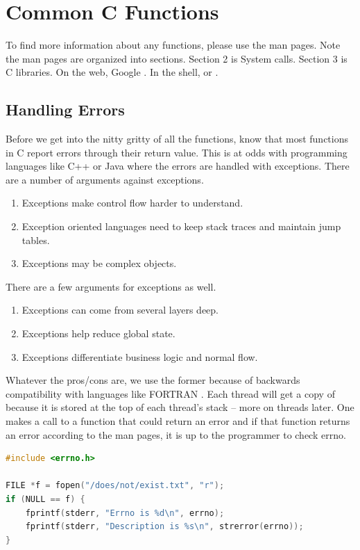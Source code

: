 \section{Common C Functions}

To find more information about any functions, please use the man pages.
Note the man pages are organized into sections.
Section 2 is System calls.
Section 3 is C libraries.
On the web, Google .
In the shell,  or .

\subsection{Handling Errors}

Before we get into the nitty gritty of all the functions, know that most functions in C report errors through their return value.
This is at odds with programming languages like C++ or Java where the errors are handled with exceptions.
There are a number of arguments against exceptions.

\begin{enumerate}
\item Exceptions make control flow harder to understand.
\item Exception oriented languages need to keep stack traces and maintain jump tables.
\item Exceptions may be complex objects.
\end{enumerate}

There are a few arguments for exceptions as well.

\begin{enumerate}
\item Exceptions can come from several layers deep.
\item Exceptions help reduce global state.
\item Exceptions differentiate business logic and normal flow.
\end{enumerate}

Whatever the pros/cons are, we use the former because of backwards compatibility with languages like FORTRAN \cite[P. 84]{fortran72}.
Each thread will get a copy of  because it is stored at the top of each thread's stack -- more on threads later.
One makes a call to a function that could return an error and if that function returns an error according to the man pages, it is up to the programmer to check errno.

\begin{lstlisting}[language=C]
#include <errno.h>

FILE *f = fopen("/does/not/exist.txt", "r");
if (NULL == f) {
    fprintf(stderr, "Errno is %d\n", errno);
    fprintf(stderr, "Description is %s\n", strerror(errno));
}
\end{lstlisting}

